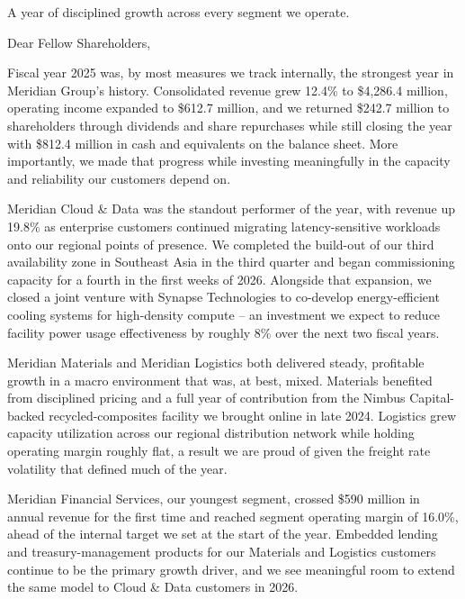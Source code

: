 \documentclass[11pt,oneside,a4paper]{scrbook}
\newcommand{\goldrule}{\noindent{\color{merGold}\rule{\linewidth}{1.1pt}}\par\vspace{2pt}\noindent{\color{merNavy!25}\rule{\linewidth}{0.4pt}}\vspace{10pt}\par}
\newcommand{\sectionlede}[1]{{\color{merSlate}\large #1}\par\vspace{6pt}}
\begin{document}
\frontmatter
\tableofcontents

\mainmatter

\goldrule

\sectionlede{A year of disciplined growth across every segment we operate.}

Dear Fellow Shareholders,

Fiscal year 2025 was, by most measures we track internally, the strongest year in Meridian Group's history. Consolidated revenue grew 12.4\% to \$4,286.4 million, operating income expanded to \$612.7 million, and we returned \$242.7 million to shareholders through dividends and share repurchases while still closing the year with \$812.4 million in cash and equivalents on the balance sheet. More importantly, we made that progress while investing meaningfully in the capacity and reliability our customers depend on.

Meridian Cloud \& Data was the standout performer of the year, with revenue up 19.8\% as enterprise customers continued migrating latency-sensitive workloads onto our regional points of presence. We completed the build-out of our third availability zone in Southeast Asia in the third quarter and began commissioning capacity for a fourth in the first weeks of 2026. Alongside that expansion, we closed a joint venture with Synapse Technologies to co-develop energy-efficient cooling systems for high-density compute -- an investment we expect to reduce facility power usage effectiveness by roughly 8\% over the next two fiscal years.

Meridian Materials and Meridian Logistics both delivered steady, profitable growth in a macro environment that was, at best, mixed. Materials benefited from disciplined pricing and a full year of contribution from the Nimbus Capital-backed recycled-composites facility we brought online in late 2024. Logistics grew capacity utilization across our regional distribution network while holding operating margin roughly flat, a result we are proud of given the freight rate volatility that defined much of the year.

Meridian Financial Services, our youngest segment, crossed \$590 million in annual revenue for the first time and reached segment operating margin of 16.0\%, ahead of the internal target we set at the start of the year. Embedded lending and treasury-management products for our Materials and Logistics customers continue to be the primary growth driver, and we see meaningful room to extend the same model to Cloud \& Data customers in 2026.
\end{document}
